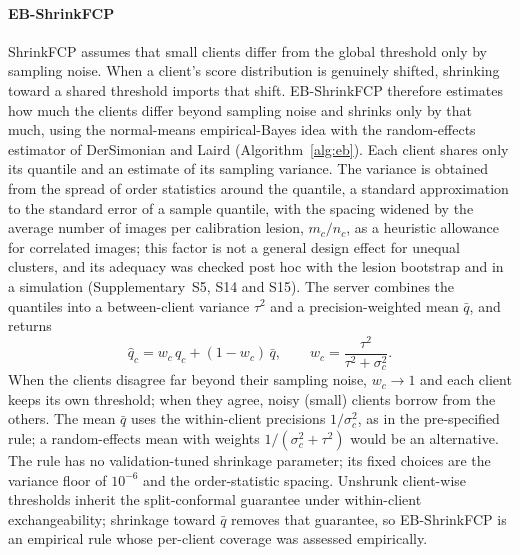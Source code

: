 \paragraph{EB-ShrinkFCP} ShrinkFCP assumes that small clients differ from the global threshold only by
sampling noise. When a client's score distribution is genuinely shifted, shrinking toward a shared
threshold imports that shift. EB-ShrinkFCP therefore estimates how much the clients differ beyond sampling
noise and shrinks only by that much, using the normal-means empirical-Bayes idea
\cite{efron1975stein} with the random-effects estimator of DerSimonian and Laird
\cite{dersimonian1986meta} (Algorithm~\ref{alg:eb}). Each client shares only its quantile and an estimate
of its sampling variance. The variance is obtained from the spread of order statistics around the
quantile, a standard approximation to the standard error of a sample quantile, with the spacing widened
by the average number of images per calibration lesion, $m_c/n_c$, as a heuristic allowance for
correlated images; this factor is not a general design effect for unequal clusters, and its adequacy was
checked post hoc with the lesion bootstrap and in a simulation (Supplementary~S5, S14 and S15). The server combines the quantiles into a
between-client variance $\tau^2$ and a precision-weighted mean $\bar q$, and returns
\begin{equation}
  \hat q_c = w_c\,q_c + (1-w_c)\,\bar q, \qquad w_c=\frac{\tau^2}{\tau^2+\sigma_c^2}.
  \label{eq:eb}
\end{equation}
When the clients disagree far beyond their sampling noise, $w_c\to1$ and each client keeps its own
threshold; when they agree, noisy (small) clients borrow from the others. The mean $\bar q$ uses the
within-client precisions $1/\sigma_c^2$, as in the pre-specified rule; a random-effects mean with weights
$1/(\sigma_c^2+\tau^2)$ would be an alternative. The rule has no validation-tuned shrinkage parameter; its
fixed choices are the variance floor of $10^{-6}$ and the order-statistic spacing. Unshrunk client-wise
thresholds inherit the split-conformal guarantee under within-client exchangeability; shrinkage toward
$\bar q$ removes that guarantee, so EB-ShrinkFCP is an empirical rule whose per-client coverage was
assessed empirically.

